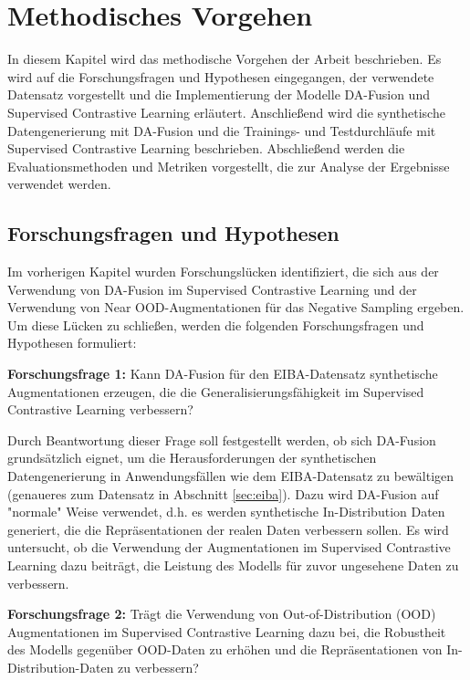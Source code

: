 \chapter{Methodisches Vorgehen}

In diesem Kapitel wird das methodische Vorgehen der Arbeit beschrieben. Es wird auf die Forschungsfragen und Hypothesen eingegangen, der verwendete Datensatz vorgestellt und die Implementierung der Modelle DA-Fusion und Supervised Contrastive Learning erläutert. Anschließend wird die synthetische Datengenerierung mit DA-Fusion und die Trainings- und Testdurchläufe mit Supervised Contrastive Learning beschrieben. Abschließend werden die Evaluationsmethoden und Metriken vorgestellt, die zur Analyse der Ergebnisse verwendet werden.

\section{Forschungsfragen und Hypothesen} \label{sec:research-questions}

Im vorherigen Kapitel wurden Forschungslücken identifiziert, die sich aus der Verwendung von DA-Fusion im Supervised Contrastive Learning und der Verwendung von Near OOD-Augmentationen für das Negative Sampling ergeben. Um diese Lücken zu schließen, werden die folgenden Forschungsfragen und Hypothesen formuliert:

\textbf{Forschungsfrage 1:} Kann DA-Fusion für den EIBA-Datensatz synthetische Augmentationen erzeugen, die die Generalisierungsfähigkeit im Supervised Contrastive Learning verbessern?

Durch Beantwortung dieser Frage soll festgestellt werden, ob sich DA-Fusion grundsätzlich eignet, um die Herausforderungen der synthetischen Datengenerierung in Anwendungsfällen wie dem EIBA-Datensatz zu bewältigen (genaueres zum Datensatz in Abschnitt \ref{sec:eiba}). Dazu wird DA-Fusion auf "normale" Weise verwendet, d.h. es werden synthetische In-Distribution Daten generiert, die die Repräsentationen der realen Daten verbessern sollen. Es wird untersucht, ob die Verwendung der Augmentationen im Supervised Contrastive Learning dazu beiträgt, die Leistung des Modells für zuvor ungesehene Daten zu verbessern.


\textbf{Forschungsfrage 2:} Trägt die Verwendung von Out-of-Distribution (OOD) Augmentationen im Supervised Contrastive Learning dazu bei, die Robustheit des Modells gegenüber OOD-Daten zu erhöhen und die Repräsentationen von In-Distribution-Daten zu verbessern?

